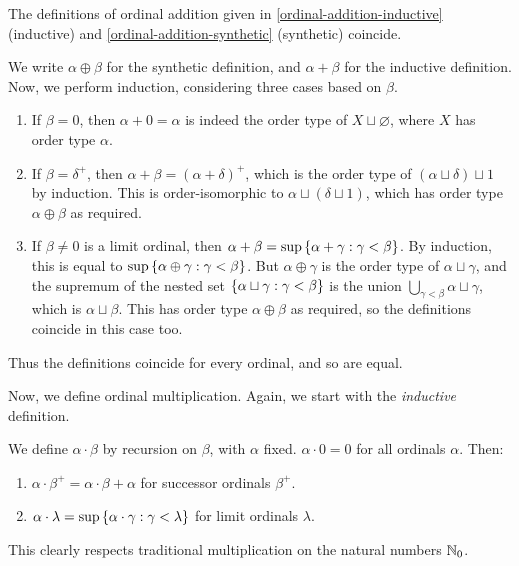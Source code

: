 \documentclass{article}
\begin{document}
\begin{proposition}
    The definitions of ordinal addition given in \ref{ordinal-addition-inductive} (inductive) and \ref{ordinal-addition-synthetic} (synthetic) coincide.
\end{proposition}

\begin{prf}
    We write $\alpha \oplus \beta$ for the synthetic definition, and $\alpha + \beta$ for the inductive definition. Now, we perform induction, considering three cases based on $\beta$.
    \begin{enumerate}
    	\item If $\beta = 0$, then $\alpha + 0 = \alpha$ is indeed the order type of $X \sqcup \varnothing$, where $X$ has order type $\alpha$.
    	\item If $\beta = \delta^+$, then $\alpha + \beta = (\alpha + \delta)^+$, which is the order type of $(\alpha \sqcup \delta) \sqcup 1$ by induction. This is order-isomorphic to $\alpha \sqcup (\delta \sqcup 1)$, which has order type $\alpha \oplus \beta$ as required.
    	\item If $\beta \neq 0$ is a limit ordinal, then $\alpha + \beta = \sup \left\lbrace \alpha + \gamma : \gamma < \beta \right\rbrace$. By induction, this is equal to $\sup \left\lbrace \alpha \oplus \gamma : \gamma < \beta \right\rbrace$. But $\alpha \oplus \gamma$ is the order type of $\alpha \sqcup \gamma$, and the supremum of the nested set $\left\lbrace \alpha \sqcup \gamma : \gamma < \beta \right\rbrace$ is the union $\bigcup_{\gamma < \beta} \alpha \sqcup \gamma$, which is $\alpha \sqcup \beta$. This has order type $\alpha \oplus \beta$ as required, so the definitions coincide in this case too.
	\end{enumerate}
	Thus the definitions coincide for every ordinal, and so are equal.
\end{prf}

Now, we define ordinal multiplication. Again, we start with the \textit{inductive} definition.

\begin{definition}
    We define $\alpha \cdot \beta$ by recursion on $\beta$, with $\alpha$ fixed. $\alpha \cdot 0 = 0$ for all ordinals $\alpha$. Then:
    \begin{enumerate}
    	\item $\alpha \cdot \beta^+ = \alpha \cdot \beta + \alpha$ for successor ordinals $\beta^+$.
    	\item $\alpha \cdot \lambda = \sup \left\lbrace \alpha \cdot \gamma : \gamma < \lambda \right\rbrace$ for limit ordinals $\lambda$.
	\end{enumerate}
	This clearly respects traditional multiplication on the natural numbers $\mathbb{N}_0$.
\end{definition}
\end{document}
